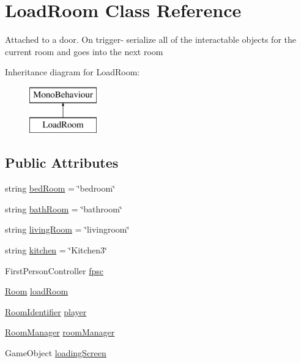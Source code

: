 \hypertarget{class_load_room}{}\section{Load\+Room Class Reference}
\label{class_load_room}


Attached to a door. On trigger-\/ serialize all of the interactable objects for the current room and goes into the next room  


Inheritance diagram for Load\+Room\+:\begin{figure}[H]
\begin{center}
\leavevmode
\includegraphics[height=2.000000cm]{class_load_room}
\end{center}
\end{figure}
\subsection*{Public Attributes}
\begin{DoxyCompactItemize}
\item 
string \hyperlink{class_load_room_a2d61561e98889da07886912d2b877f25}{bed\+Room} = \char`\"{}bedroom\char`\"{}
\item 
string \hyperlink{class_load_room_a2820dabeeeba9788dcb461d5b6902ab7}{bath\+Room} = \char`\"{}bathroom\char`\"{}
\item 
string \hyperlink{class_load_room_abcb915de7cd7a198c227c0fb6fd14abb}{living\+Room} = \char`\"{}livingroom\char`\"{}
\item 
string \hyperlink{class_load_room_ae648aada37ee6e440b80db86f402e99d}{kitchen} = \char`\"{}Kitchen3\char`\"{}
\item 
First\+Person\+Controller \hyperlink{class_load_room_a6e6cf65efb65b521d908235a47173842}{fpsc}
\item 
\hyperlink{_load_room_8cs_a487e93cb0c81b7ae3c65d743fde387c0}{Room} \hyperlink{class_load_room_ac2bc4bbe4711024d88ea84aefa93360f}{load\+Room}
\item 
\hyperlink{class_room_identifier}{Room\+Identifier} \hyperlink{class_load_room_ad89f4048cd330067fe3bd7463db5a61a}{player}
\item 
\hyperlink{class_room_manager}{Room\+Manager} \hyperlink{class_load_room_a5c7958b95901648e910d75dbda560d52}{room\+Manager}
\item 
Game\+Object \hyperlink{class_load_room_a308e03f01638759404f53480035a56ef}{loading\+Screen}
\end{DoxyCompactItemize}


